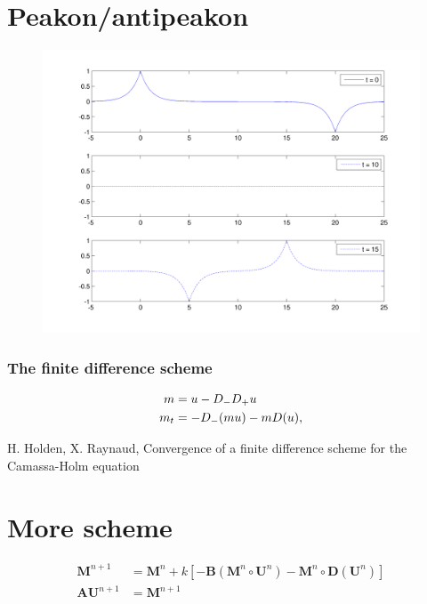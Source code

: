 \documentclass{beamer}
\begin{document}
\section{Peakon/antipeakon}
\begin{frame}

\begin{figure}
\includegraphics[width=0.8\linewidth]{gfx/peakonantipeakon}
\end{figure}

\end{frame}


\begin{frame}
\frametitle{The finite difference scheme}

\begin{align*}
m &= u - D_- D_+ u \notag \\
m_t &=- D_- ( m u ) - m D ( u ), 
\end{align*} 

\vspace{3.5cm}

\tiny{H. Holden, X. Raynaud, Convergence of a finite difference scheme for the Camassa-Holm equation}


\end{frame}



\section*{More scheme}
\begin{frame}

\begin{align*}
\bm{M}^{n+1} &= \bm{M}^{n} + k \left[- \bm{B} (\bm{M}^n \circ \bm{U}^n) - \bm{M}^n \circ \bm{D} (\bm{U}^n)\right] \\
\bm{AU}^{n + 1} &= \bm{M}^{n+1}
\end{align*}
\end{frame}
\end{document}

